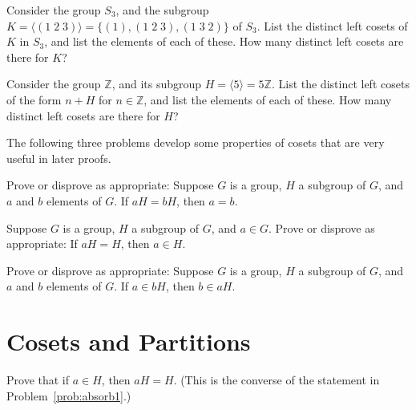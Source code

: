 \begin{problem}
Consider the group \(S_3\), and the subgroup \(K = \langle (1\;2\;3) \rangle = \{(1), (1\;2\;3), (1\;3\;2)\}\) of \(S_3\). List the distinct left cosets of \(K\) in \(S_3\), and list the elements of each of these. How many distinct left cosets are there for \(K\)?
\end{problem}

\begin{problem}
Consider the group \(\mathbb{Z}\), and its subgroup \(H = \langle 5\rangle =5\mathbb{Z} \). List the distinct left cosets of the form \(n+H\) for \(n\in \mathbb{Z}\), and list the elements of each of these. How many
distinct left cosets are there for \(H\)?
\end{problem}

The following three problems develop some properties of cosets that are
very useful in later proofs.

\begin{problem}
Prove or disprove as appropriate: Suppose \(G\) is a group, \(H\) a subgroup of \(G\), and \(a\) and \(b\) elements of \(G\). If \(aH = bH\), then \(a = b\).
\end{problem}

\begin{problem}\label{prob:absorb1}
Suppose \(G\) is a group, \(H\) a subgroup of \(G\), and \(a \in G\). Prove or disprove as appropriate: If \(aH = H\), then \(a \in H\).
\end{problem}

\begin{problem}\label{prob:cosetsym}
Prove or disprove as appropriate: Suppose \(G\) is a group, \(H\) a subgroup of \(G\), and \(a\) and \(b\) elements of \(G\).  If \(a \in bH\), then \(b \in aH\).
\begin{annotation}
\end{annotation}
\end{problem}

\section{Cosets and Partitions}

\begin{problem}\label{prob:absorb2}
Prove that if \(a \in H\), then \(aH = H\). (This is the converse of the statement in Problem~\ref{prob:absorb1}.)
\begin{annotation}
\end{annotation}
\end{problem}

